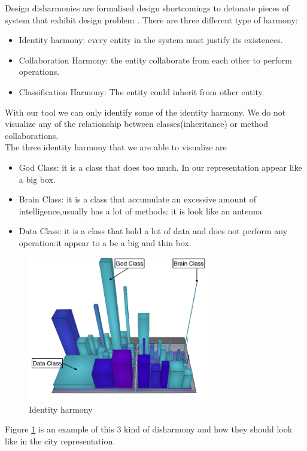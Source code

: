 \documentclass[]{usiinfbachelorproject}
\begin{document}
Design disharmonies are formalised design shortcomings to detonate pieces of system that exhibit design problem \cite{Disharmony}. 
There are three different type of harmony:
\begin{itemize}
\item Identity harmony: every entity in the system must justify its existences.
\item Collaboration Harmony:  the entity collaborate from each other to perform operations.
\item Classification Harmony: The entity could inherit from other entity. 
\end{itemize} 
With our tool we can only identify some of the identity harmony. We do not visualize any of the relationship between classes(inheritance) or method collaborations.\\
The three identity harmony that we are able to visualize are
\begin{itemize}
\item{God Class}: it is a class that does too much. In our representation appear like a big box.
\item{Brain Class}: it is a class that accumulate an excessive amount of intelligence,usually has a lot of methods: it is look like an antenna
\item{Data Class}: it is a class that hold a lot of data and does not perform any operation:it appear to a be a big and thin box.

\end{itemize} 
\begin{figure}[h]
	\centering
\includegraphics[width=8cm]{images/disharmony}

\caption{Identity harmony\label {fig:harmony}}
\end{figure}

Figure \ref{fig:harmony} is an example of this 3 kind of disharmony and how they should look like in the city representation.
\end{document}

